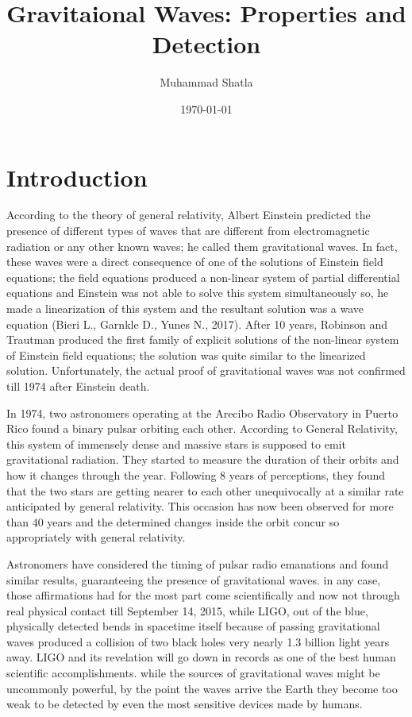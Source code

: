 \documentclass[11]{article}
\begin{document}
\tableofcontents
\title{Gravitaional Waves: Properties and Detection}
\author{Muhammad Shatla}
\date{\today}
\maketitle

\section{Introduction}
\setlength{\parindent}{5ex}
According to the theory of general relativity, Albert Einstein predicted the presence of different types of waves that are different from electromagnetic radiation or any other known waves; he called them gravitational waves. In fact, these waves were a direct consequence of one of the solutions of Einstein field equations; the field equations produced a non-linear system of partial differential equations and Einstein was not able to solve this system simultaneously so, he made a linearization of this system and the resultant solution was a wave equation (Bieri L., Garnkle D., Yunes N., 2017). After 10 years, Robinson and Trautman produced the first family of explicit solutions of the non-linear system of Einstein field equations; the solution was quite similar to the linearized solution. Unfortunately, the actual proof of gravitational waves was not confirmed till 1974 after Einstein death.
   
\vspace{5mm}
   In 1974, two astronomers operating at the Arecibo Radio Observatory in Puerto Rico found a binary pulsar orbiting each other. According to General Relativity, this system of immensely dense and massive stars is supposed to emit gravitational radiation. They started to measure the duration of their orbits and how it changes through the year. Following 8 years of perceptions, they found that the two stars are getting nearer to each other unequivocally at a similar rate anticipated by general relativity. This occasion has now been observed for more than 40 years and the determined changes inside the orbit concur so appropriately with general relativity.
   
\vspace{5mm}
   Astronomers have considered the timing of pulsar radio emanations and found similar results, guaranteeing the presence of gravitational waves. in any case, those affirmations had for the most part come scientifically and now not through real physical contact till September 14, 2015, while LIGO, out of the blue, physically detected bends in spacetime itself because of passing gravitational waves produced a collision of two black holes very nearly 1.3 billion light years away. LIGO and its revelation will go down in records as one of the best human scientific accomplishments. while the sources of gravitational waves might be uncommonly powerful, by the point the waves arrive the Earth they become too weak to be detected by even the most sensitive devices made by humans.
   
\end{document}
